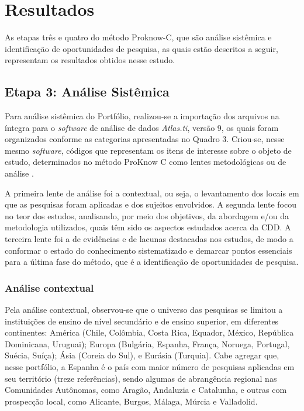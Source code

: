 \documentclass[portuguese]{textolivre}
\begin{document}
\section{Resultados}

As etapas três e quatro do método Proknow-C, que são análise sistêmica e identificação de oportunidades de pesquisa, as quais estão descritos a seguir, representam os resultados obtidos nesse estudo.

\subsection{Etapa 3: Análise Sistêmica}

Para análise sistêmica do Portfólio, realizou-se a importação dos arquivos na íntegra para o \textit{software} de análise de dados \textit{Atlas.ti}, versão 9, os quais foram organizados conforme as categorias apresentadas no Quadro 3. Criou-se, nesse mesmo \textit{software}, códigos que representam os itens de interesse sobre o objeto de estudo, determinados no método ProKnow C como lentes metodológicas ou de análise \cite{ensslin_proknow-c_2010,linhares_capacidade_2019}.

A primeira lente de análise foi a contextual, ou seja, o levantamento dos locais em que as pesquisas foram aplicadas e dos sujeitos envolvidos. A segunda lente focou no teor dos estudos, analisando, por meio dos objetivos, da abordagem e/ou da metodologia utilizados, quais têm sido os aspectos estudados acerca da CDD. A terceira lente foi a de evidências e de lacunas destacadas nos estudos, de modo a conformar o estado do conhecimento sistematizado e demarcar pontos essenciais para a última fase do método, que é a identificação de oportunidades de pesquisa.

\subsubsection{Análise contextual}

Pela análise contextual, observou-se que o universo das pesquisas se limitou a instituições de ensino de nível secundário e de ensino superior, em diferentes continentes: América (Chile, Colômbia, Costa Rica, Equador, México, República Dominicana, Uruguai); Europa (Bulgária, Espanha, França, Noruega, Portugal, Suécia, Suíça); Ásia (Coreia do Sul), e Eurásia (Turquia). Cabe agregar que, nesse portfólio, a Espanha é o país com maior número de pesquisas aplicadas em seu território (treze referências), sendo algumas de abrangência regional nas Comunidades Autônomas, como Aragão, Andaluzia e Catalunha, e outras com prospecção local, como Alicante, Burgos, Málaga, Múrcia e Valladolid.
\end{document}
